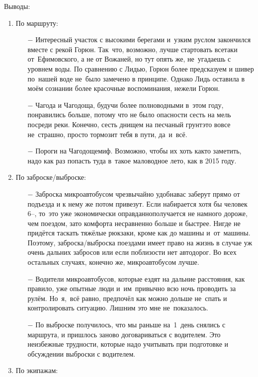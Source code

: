 Выводы:
\begin{enumerate}
\item По маршруту:
	\begin{enumerate}
	\item[$-$] Интересный участок с высокими берегами и~узким руслом закончился вместе с рекой Горюн. Так~что, возможно, лучше стартовать все\sdash таки от~Ефимовского, а не от Вожаней, но тут опять же, не~угадаешь с уровнем воды. По сравнению с Лидью, Горюн более предсказуем и шивер по~нашей воде не~было замечено в принципе. Однако Лидь оставила в моём сознании более красочные воспоминания, нежели Горюн.
	\item[$-$] Чагода и Чагодоща, будучи более полноводными в~этом году, понравились больше, потому что не было опасности сесть на мель посреди реки. Конечно, сесть днищем на песчаный грунт\mdash это вовсе не~страшно, просто тормозит тебя в пути, да~и~всё.
	\item[$-$] Пороги на Чагодоще\mdash миф. Возможно, чтобы их хоть как\sdash то заметить, надо как раз попасть туда в~такое маловодное лето, как в 2015 году.	
	\end{enumerate}	
\item По заброске/выброске:
	\begin{enumerate}
	\item[$-$] Заброска микроавтобусом чрезвычайно удобна\mdash вас заберут прямо от подъезда и к нему же потом привезут. Если набирается хотя бы человек 6\thinspace\nobreakdash--, то~это уже экономически оправданно\mdash получается не намного дороже, чем поездом, зато комфорта несравненно больше и быстрее. Нигде не придётся таскать тяжёлые рюкзаки, кроме как до машины и~от~машины. Поэтому, заброска/выброска поездами имеет право на жизнь в случае уж очень дальних забросов или если поблизости нет автодорог. Во всех остальных случаях, конечно же, микроавтобусом лучше.
	\item[$-$] Водители микроавтобусов, которые ездят на дальние расстояния, как правило, уже опытные люди и~им~привычно всю ночь проводить за рулём. Но~я,~всё равно, предпочёл как можно дольше не~спать и контролировать ситуацию. Лишним это мне не~показалось.
	\item[$-$] По выброске получилось, что мы раньше на~1~день снялись с маршрута, и пришлось заново договариваться с водителем. Это неизбежные трудности, которые надо учитывать при подготовке и обсуждении выброски с водителем.
	\end{enumerate}	
\item По экипажам:

\end{enumerate}
